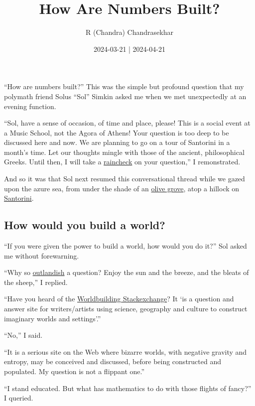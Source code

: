 \documentclass[
  a4paper,
]{article}
\title{How Are Numbers Built?}
\author{R (Chandra) Chandrasekhar}
\date{2024-03-21 | 2024-04-21}
\begin{document}
\maketitle

\thispagestyle{empty}


``How are numbers built?'' This was the simple but profound question
that my polymath friend Solus ``Sol'' Simkin asked me when we met
unexpectedly at an evening function.

``Sol, have a sense of occasion, of time and place, please! This is a
social event at a Music School, not the Agora of Athens! Your question
is too deep to be discussed here and now. We are planning to go on a
tour of Santorini in a month's time. Let our thoughts mingle with those
of the ancient, philosophical Greeks. Until then, I will take a
\href{https://dictionary.cambridge.org/dictionary/english/raincheck}{raincheck}
on your question,'' I remonstrated.

And so it was that Sol next resumed this conversational thread while we
gazed upon the azure sea, from under the shade of an
\href{http://wedding.beleon.com/media/15172-beleontoursgreeceweddingsantoriniolivegrove.jpg}{olive
grove}, atop a hillock on
\href{https://en.wikipedia.org/wiki/Santorini}{Santorini}.

\subsection{How would you build a
world?}\label{how-would-you-build-a-world}

``If you were given the power to build a world, how would you do it?''
Sol asked me without forewarning.

``Why so
\href{https://dictionary.cambridge.org/dictionary/english/outlandish}{outlandish}
a question? Enjoy the sun and the breeze, and the bleats of the sheep,''
I replied.

``Have you heard of the
\href{https://worldbuilding.stackexchange.com/}{Worldbuilding
Stackexchange}? It `is a question and answer site for writers/artists
using science, geography and culture to construct imaginary worlds and
settings'.''

``No,'' I said.

``It is a serious site on the Web where bizarre worlds, with negative
gravity and entropy, may be conceived and discussed, before being
constructed and populated. My question is not a flippant one.''

``I stand educated. But what has mathematics to do with those flights of
fancy?'' I queried.
\end{document}
